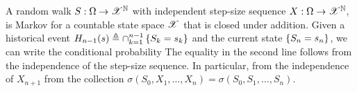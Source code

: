 \documentclass[letterpaper,10pt,english]{article}
\begin{document}
\begin{shaded}
\begin{exmp} 
A random walk $S:\Omega\to\mathscr{X}^{\mathbb{N}}$ with independent step-size sequence $X:\Omega\to\mathscr{X}^{\mathbb{N}}$, 
is Markov for a countable state space $\mathscr{X}$ that is closed under addition. 
Given a historical event $H_{n-1}(s) \triangleq \cap_{k=1}^{n-1}\left\{S_k = s_k\right\}$ and the current state $\left\{S_n = s_n\right\}$, 
we can write the conditional probability 
The equality in the second line follows from the independence of the step-size sequence. 
In particular, from the independence of $X_{n+1}$ from the collection $\sigma(S_0, X_1, \dots, X_n) = \sigma(S_0, S_1, \dots, S_n)$. 
\end{exmp}
\end{shaded}
\end{document}

